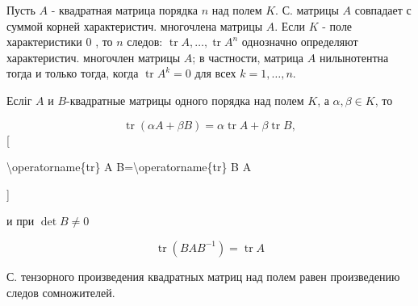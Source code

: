 \documentclass[10pt]{article}
\begin{document}
Пусть $A$ - квадратная матрица порядка $n$ над полем $K$. С. матрицы $A$ совпадает с суммой корней характеристич. многочлена матрицы $A$. Если $K$ - поле характеристики 0 , то $n$ следов: $\operatorname{tr} A, \ldots, \operatorname{tr} A^{n}$ однозначно определяют характеристич. многочлен матрицы $A$; в частности, матрица $A$ нилынотентна тогда и только тогда, когда $\operatorname{tr} A^{k}=0$ для всех $k=1, \ldots, n$.



Есліг $A$ и $B$-квадратные матрицы одного порядка над полем $K$, а $\alpha, \beta \in K$, то



\[

\operatorname{tr}(\alpha A+\beta B)=\alpha \operatorname{tr} A+\beta \operatorname{tr} B,

\][



\textbackslash operatorname\{tr\} A B=\textbackslash operatorname\{tr\} B A

]



и при $\operatorname{det} B \neq 0$



\[

\operatorname{tr}\left(B A B^{-1}\right)=\operatorname{tr} A

\]



С. тензорного произведения квадратных матриц над полем равен произведению следов сомножителей.
\end{document}
